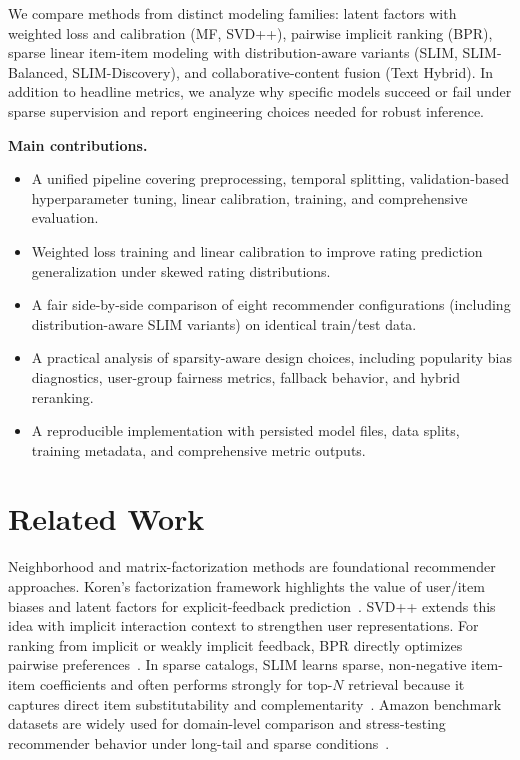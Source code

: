 \documentclass[sigconf,nonacm]{acmart}
\begin{document}
We compare methods from distinct modeling families: latent factors with weighted loss and calibration (MF, SVD++), pairwise implicit ranking (BPR), sparse linear item-item modeling with distribution-aware variants (SLIM, SLIM-Balanced, SLIM-Discovery), and collaborative-content fusion (Text Hybrid). In addition to headline metrics, we analyze why specific models succeed or fail under sparse supervision and report engineering choices needed for robust inference.

\textbf{Main contributions.}
\begin{itemize}
  \item A unified pipeline covering preprocessing, temporal splitting, validation-based hyperparameter tuning, linear calibration, training, and comprehensive evaluation.
  \item Weighted loss training and linear calibration to improve rating prediction generalization under skewed rating distributions.
  \item A fair side-by-side comparison of eight recommender configurations (including distribution-aware SLIM variants) on identical train/test data.
  \item A practical analysis of sparsity-aware design choices, including popularity bias diagnostics, user-group fairness metrics, fallback behavior, and hybrid reranking.
  \item A reproducible implementation with persisted model files, data splits, training metadata, and comprehensive metric outputs.
\end{itemize}

\section{Related Work}
Neighborhood and matrix-factorization methods are foundational recommender approaches. Koren's factorization framework highlights the value of user/item biases and latent factors for explicit-feedback prediction~\cite{koren2008factorization}. SVD++ extends this idea with implicit interaction context to strengthen user representations. For ranking from implicit or weakly implicit feedback, BPR directly optimizes pairwise preferences~\cite{rendle2009bpr}. In sparse catalogs, SLIM learns sparse, non-negative item-item coefficients and often performs strongly for top-$N$ retrieval because it captures direct item substitutability and complementarity~\cite{ning2011slim}. Amazon benchmark datasets are widely used for domain-level comparison and stress-testing recommender behavior under long-tail and sparse conditions~\cite{mcauley2015amazon}.
\end{document}
